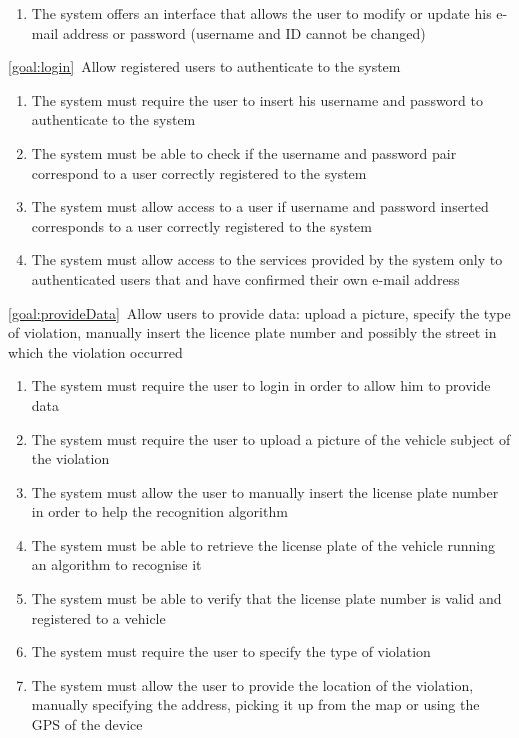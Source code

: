 \begin{description}
\begin{enumerate}[label=\textbf{R\arabic*}]
   				\item The system offers an interface that allows the user to modify or update his e-mail address or password (username and ID cannot be changed)
  			\end{enumerate}
		\item \ref{goal:login}\ Allow registered users to authenticate to the system
			\begin{enumerate}[resume*]
  				\item The system must require the user to insert his username and password to authenticate to the system
   				\item The system must be able to check if the username and password pair
   				correspond to a user correctly registered to the system
   				\item The system must allow access to a user if username and password inserted corresponds to a user correctly registered to the system
   				\item The system must allow access to the services provided by the system only to authenticated users that and have confirmed their own e-mail address
			\end{enumerate}
		\item \ref{goal:provideData}\ Allow users to provide data: upload a picture, specify the type of violation, manually insert the licence plate number and possibly the street in which the violation occurred
			\begin{enumerate}[resume*]
				\item The system must require the user to login in order to allow him to provide data
				\item The system must require the user to upload a picture of the vehicle subject of the violation
  				\item The system must allow the user to manually insert the license plate number in order to help the recognition algorithm
  				\item The system must be able to retrieve the license plate of the vehicle running an algorithm to recognise it
  				\item The system must be able to verify that the license plate number is valid and registered to a vehicle
  				\item The system must require the user to specify the type of violation
  				\item The system must allow the user to provide the location of the violation, manually specifying the address, picking it up from the map or using the GPS of the device

\end{enumerate}
\end{description}
